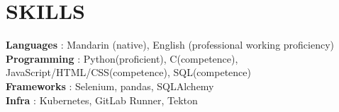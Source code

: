 \documentclass[letterpaper,11pt]{article}
\begin{document}
\section{SKILLS}
 \begin{itemize}[leftmargin=0in, label={}]
    \small{\item{
     \textbf{Languages} {: Mandarin (native), English (professional working proficiency)}\vspace{2pt} \\
     \textbf{Programming} {: Python(proficient), C(competence), JavaScript/HTML/CSS(competence), SQL(competence)}\vspace{2pt} \\
     \textbf{Frameworks}     {: Selenium, pandas, SQLAlchemy} \\
     \textbf{Infra}     {: Kubernetes, GitLab Runner, Tekton}
    }}
 \end{itemize}


\end{document}
